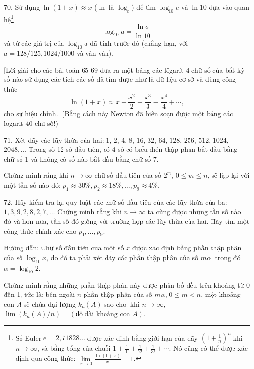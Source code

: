 \begin{problem}{70.}
	Sử dụng $\ln(1+x)\approx x$ ($\ln$ là $\log_e$) để tìm $\log_{10} e$ và $\ln 10$ dựa vào quan hệ\footnote{Số Euler $e=2,71828\dots$ được xác định bằng giới hạn của dãy $\left(1+\frac{1}{n}\right)^n$ khi $n\to \infty$, và bằng tổng của chuỗi $1+\frac{1}{1!}+\frac{1}{2!}+\frac{1}{3!}+\dotsb$. Nó cũng có thể được xác định qua công thức: $\lim\limits_{x\to 0}\frac{\ln(1+x)}{x} = 1$.}
	\begin{equation*}
		\log_{10} a=\frac{\ln a}{\ln 10}
	\end{equation*} 
	và từ các giá trị của $\log_{10} a$ đã tính trước đó (chẳng hạn, với $a=128/125, 1024/1000$ và vân vân).

	[Lời giải cho các bài toán 65-69 đưa ra một bảng các lôgarít 4 chữ số của bất kỳ số nào sử dụng các tích các số đã tìm được như là dữ liệu cơ sở và dùng công thức
	\begin{equation*}
		\ln (1+x) \approx x-\frac{x^2}{2}+\frac{x^3}{3}-\frac{x^4}{4}+\dotsb,
	\end{equation*}
	cho sự hiệu chỉnh.] (Bằng cách này Newton đã biên soạn được một bảng các logarit 40 chữ số!)
\end{problem}

\begin{problem}{71.}
	Xét dãy các lũy thừa của hai: $1$, $2$, $4$, $8$, $16$, $32$, $64$, $128$, $256$, $512$, $1024$, $2048, \dotsc$ Trong số 12 số đầu tiên, có 4 số có biểu diễn thập phân bắt đầu bằng chữ số 1 và không có số nào bắt đầu bằng chữ số 7.

	Chứng minh rằng khi $n\to \infty$ chữ số đầu tiên của số $2^m$, $0\leqslant m\leqslant n$, sẽ lặp lại với một tần số nào đó: 
	$p_1 \approx 30\%, p_2 \approx 18\%, \dotsc, p_9 \approx 4\%$.
\end{problem}

\begin{problem}{72.}
	Hãy kiểm tra lại quy luật các chữ số đầu tiên của các lũy thừa của ba: $1,
	3, 9, 2, 8, 2, 7, \dotsc$ Chứng minh rằng khi $n\rightarrow \infty$ ta cũng được những tần số nào đó và hơn nữa, tần số đó giống với trường hợp các lũy thừa của hai. Hãy tìm một công thức chính xác cho $p_1, \dotsc, p_9$.

	\begin{note}{Hướng dẫn:}
		Chữ số đầu tiên của một số $x$ được xác định bằng phần thập phân của số $\log_{10} x$, do đó ta phải xét dãy các phần thập phân của số $m \alpha$, trong đó $\alpha=\log_{10} 2$.
	\end{note}
	Chứng minh rằng những phần thập phân này được phân bố đều trên khoảng từ 0 đến 1, tức là: bên ngoài $n$ phần thập phân của số $m \alpha$, $0\leqslant m<n$, một khoảng con $A$ sẽ chứa đại lượng $k_n(A)$ sao cho, khi $n \to \infty$, $\lim(k_n(A)/n)=(\text{độ dài khoảng con $A$})$.
\end{problem}


